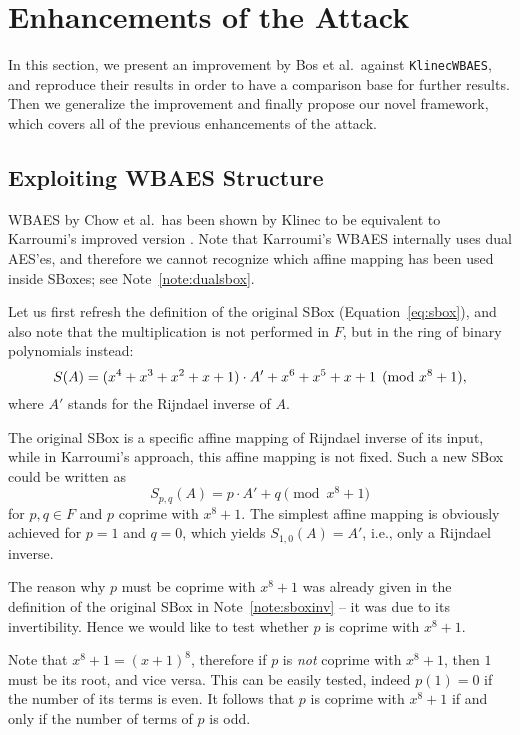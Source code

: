 \section{Enhancements of the Attack}
\label{sec:enhancements}

In this section, we present an improvement by Bos et al.\ against {\tt KlinecWBAES}, and reproduce their results in order to have a comparison base for further results. Then we generalize the improvement and finally propose our novel framework, which covers all of the previous enhancements of the attack.



\subsection{Exploiting WBAES Structure}

WBAES by Chow et al.\ has been shown by Klinec \cite{klinec2013white} to be equivalent to Karroumi's improved version \cite{karroumi2010protecting}. Note that Karroumi's WBAES internally uses dual AES'es, and therefore we cannot recognize which affine mapping has been used inside SBoxes; see Note~\ref{note:dualsbox}.

Let us first refresh the definition of the original SBox (Equation~\ref{eq:sbox}), and also note that the multiplication is not performed in $F$, but in the ring of binary polynomials instead:
\[
	S(A) = (x^4 + x^3 + x^2 + x + 1) \cdot A' + x^6 + x^5 + x + 1 \pmod{x^8+1} ,
\]
where $A'$ stands for the Rijndael inverse of $A$.

The original SBox is a specific affine mapping of Rijndael inverse of its input, while in Karroumi's approach, this affine mapping is not fixed. Such a new SBox could be written as
\begin{equation}
\label{eq:spq}
	S_{p,q}(A) = p\cdot A' + q \pmod{x^8+1}
\end{equation}
for $p,q\in F$ and $p$ coprime with $x^8+1$. The simplest affine mapping is obviously achieved for $p=1$ and $q=0$, which yields $S_{1,0}(A) = A'$, i.e., only a Rijndael inverse.

\newpage   %

\begin{remark}
\label{rem:coprime}
	The reason why $p$ must be coprime with $x^8+1$ was already given in the definition of the original SBox in Note~\ref{note:sboxinv} -- it was due to its invertibility. Hence we would like to test whether $p$ is coprime with $x^8+1$.
	
	Note that $x^8+1 = (x+1)^8$, therefore if $p$ is {\em not} coprime with $x^8+1$, then $1$ must be its root, and vice versa. This can be easily tested, indeed $p(1) = 0$ if the number of its terms is even. It follows that $p$ is coprime with $x^8+1$ if and only if the number of terms of $p$ is odd.
\end{remark}


